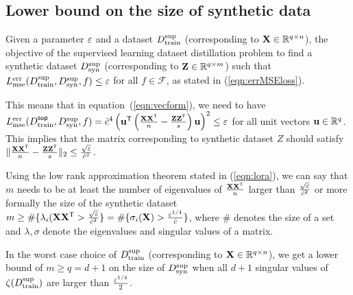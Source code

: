 \subsection{Lower bound on the size of synthetic data} 
Given a parameter ${\varepsilon}$ and a dataset $D_{\textnormal{train}}^{\textnormal{sup}}$ (corresponding to ${\mathbf{X}} \in \mathbb{R}^{q \times n}$), the objective of the supervised learning dataset distillation problem to find a synthetic dataset $D_{\textnormal{syn}}^{\textnormal{sup}}$ (corresponding to ${\mathbf{Z}} \in \mathbb{R}^{q \times m}$) such that $L_{\textnormal{mse}}^{\textnormal{err}}(D_{\textnormal{train}}^{\textnormal{sup}}, D_{\textnormal{syn}}^{\textnormal{sup}}, f) \leq {\varepsilon}$ for all $f \in \mathcal{F}$, as stated in (\ref{eqn:errMSEloss}). 

This means that in equation~(\ref{eqn:vecform}), we need to have $L^{\textnormal{err}}_{\textnormal{mse}}(D^{\sf sup}_{\textnormal{train}}, D_{\textnormal{syn}}^{\textnormal{sup}}, f) = \hat{c}^4\left({\mathbf{u}}^{\sf T}\left(\frac{{\mathbf{X}}{\mathbf{X}}^{\sf T}}{n}-\frac{{\mathbf{Z}}{\mathbf{Z}}^{\sf T}}{s}\right){\mathbf{u}}\right)^2 \leq {\varepsilon}$ for all unit vectors ${\mathbf{u}} \in \mathbb{R}^q$. This implies that the matrix corresponding to synthetic dataset $Z$ should satisfy $\|\frac{{\mathbf{X}}{\mathbf{X}}^{\sf T}}{n}-\frac{{\mathbf{Z}}{\mathbf{Z}}^{\sf T}}{s}\|_2 \leq \frac{\sqrt{{\varepsilon}}}{\hat{c}^2}$.

Using the low rank approximation theorem stated in (\ref{eqn:lora}), we can say that $m$ needs to be at least the number of eigenvalues of $\frac{{\mathbf{X}}{\mathbf{X}}^{\sf T}}{n}$ larger than $\frac{\sqrt{{\varepsilon}}}{\hat{c}^2}$ or more formally the size of the synthetic dataset $m\geq \#\{\lambda_i({\mathbf{X}}{\mathbf{X}}^{\sf T} > \frac{\sqrt{{\varepsilon}}}{\hat{c}^2}\}= \#\{\sigma_i({\mathbf{X}}) > \frac{{{\varepsilon}}^{1/4}}{\hat{c}}\}$, where $\#$ denotes the size of a set and $\lambda, \sigma$ denote the eigenvalues and singular values of a matrix.

In the worst case choice of $D_{\textnormal{train}}^{\textnormal{sup}}$ (corresponding to ${\mathbf{X}} \in \mathbb{R}^{q \times n}$), we get a lower bound of $m\geq q = d+1$ on the size of $D_{\textnormal{syn}}^{\textnormal{sup}}$ when all $d+1$ singular values of $\zeta(D_{\textnormal{train}}^{\textnormal{sup}})$ are larger than $\frac{{{\varepsilon}}^{1/4}}{2}$.

